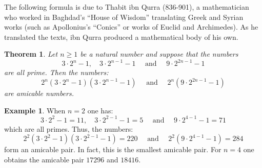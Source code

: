 \documentclass[12pt]{article}
\newtheorem*{thm}{Theorem}
\theoremstyle{definition}
\newtheorem*{exa}{Example}
\begin{document}
The following formula is due to Thabit ibn Qurra (836-901), a mathematician who worked in Baghdad's ``House of Wisdom'' translating Greek and Syrian works (such as Apollonius's ``Conics'' or works of Euclid and Archimedes). As he translated the texts, ibn Qurra produced a mathematical body of his own.

\begin{thm}
Let $n\geq 1$ be a natural number and suppose that the numbers 
$$3\cdot 2^n -1, \quad 3\cdot 2^{n-1}-1 \quad \text{ and } \quad 9\cdot 2^{2n-1}-1$$
are all prime. Then the numbers:
$$2^n(3\cdot 2^n-1)(3\cdot 2^{n-1}-1)\quad \text{ and } \quad 2^n(9\cdot 2^{2n-1}-1)$$
are amicable numbers.
\end{thm}

\begin{exa}
When $n=2$ one has:
$$3\cdot 2^2 -1=11, \quad 3\cdot 2^{2-1}-1=5 \quad \text{ and } \quad 9\cdot 2^{4-1}-1=71$$
which are all primes. Thus, the numbers:
$$2^2(3\cdot 2^2-1)(3\cdot 2^{2-1}-1)=220\quad \text{ and } \quad 2^2(9\cdot 2^{4-1}-1)=284$$
form an amicable pair. In fact, this is the smallest amicable pair. For $n=4$ one obtains the amicable pair $17296$ and $18416$.
\end{exa}
\end{document}
